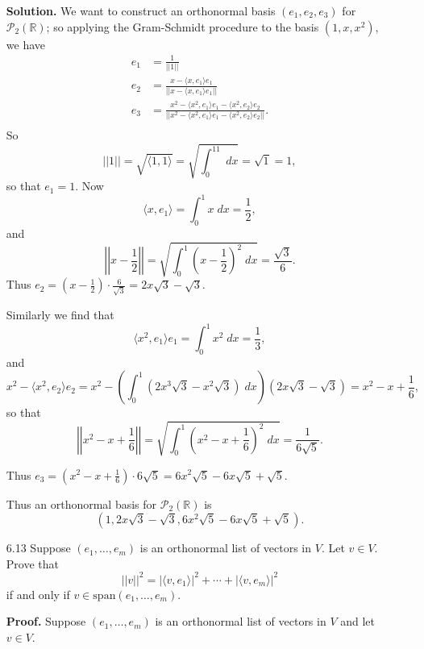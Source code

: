 \documentclass[9pt]{article}
\newcommand{\R}{\mathbb{R}}
\newcommand{\cyc}[1]{\langle #1 \rangle}
\begin{document}
\begin{enumerate}
      \textbf{Solution.} We want to construct an orthonormal basis
      $(e_1, e_2, e_3)$ for $\mathcal{P}_2(\R)$; so applying the Gram-Schmidt
      procedure to the basis $(1, x, x^2)$, we have
      \begin{align*}
         e_1 &= \frac{1}{||1||} \\
         e_2 &= \frac{x - \cyc{x, e_1}e_1}{||x - \cyc{x, e_1}e_1||} \\
         e_3 &= \frac{x^2 - \cyc{x^2, e_1}e_1 - \cyc{x^2, e_2}e_2}
                     {||x^2 - \cyc{x^2, e_1}e_1 - \cyc{x^2, e_2}e_2||}. \\
      \end{align*}
      So $$||1|| = \sqrt{\cyc{1, 1}} = \sqrt{\int_0^11\;dx} = \sqrt{1} = 1,$$
      so that $e_1 = 1$. Now
      $$\cyc{x, e_1} = \int_0^1x\;dx = \frac{1}{2},$$
      and
      $$
         \left|\left|x - \frac{1}{2}\right|\right| =
         \sqrt{\int_0^1\left(x - \frac{1}{2}\right)^2\;dx}
                 = \frac{\sqrt{3}}{6}.$$
      Thus $\displaystyle e_2 = \left(x - \frac{1}{2}\right) \cdot
            \frac{6}{\sqrt{3}} = 2x\sqrt{3} - \sqrt{3}.$

      Similarly we find that
      $$\cyc{x^2, e_1}e_1 = \int_0^1 x^2\;dx = \frac{1}{3},$$
      and
      $$x^2 - \cyc{x^2, e_2}e_2 = x^2 - \left(\int_0^1(2x^3\sqrt{3} - 
         x^2\sqrt{3})\;dx\right)(2x\sqrt{3} - \sqrt{3}) =
         x^2 - x + \frac{1}{6},$$
      so that
      $$\left|\left|x^2 - x + \frac{1}{6}\right|\right| =
        \sqrt{\int_0^1\left(x^2 - x + \frac{1}{6}\right)^2\;dx}
                 = \frac{1}{6\sqrt{5}}.$$

      Thus $\displaystyle e_3 = \left(x^2 - x + \frac{1}{6}\right) \cdot
            6\sqrt{5} = 6x^2\sqrt{5} - 6x\sqrt{5} + \sqrt{5}$.

      Thus an orthonormal basis for $\mathcal{P}_2(\R)$ is
      $$(1, 2x\sqrt{3} - \sqrt{3}, 6x^2\sqrt{5} - 6x\sqrt{5} + \sqrt{5}).$$
   \item[6.13] Suppose $(e_1, \ldots, e_m)$ is an orthonormal list of vectors in
               $V$. Let $v \in V$. Prove that
               $$||v||^2 = |\cyc{v, e_1}|^2 + \cdots + |\cyc{v, e_m}|^2$$
               if and only if $v \in \text{span}(e_1, \ldots, e_m)$.
               
      \textbf{Proof.} Suppose $(e_1, \ldots, e_m)$ is an orthonormal list of
      vectors in $V$ and let $v \in V$.
      

\end{enumerate}
\end{document}
